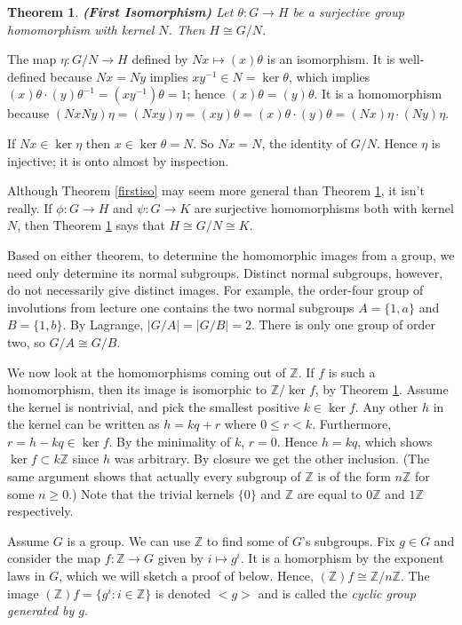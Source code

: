 \documentclass[letterpaper]{article}
\newtheorem{theorem}{Theorem}[section]
\newcommand{\mdot}{{\cdot}}
\newenvironment{proof}[1][Proof]{\begin{trivlist}
\item[\hskip \labelsep {\bfseries #1}]}{\end{trivlist}}
\begin{document}
\begin{theorem}
\label{iso1}
\emph{\textbf{(First Isomorphism)}}
Let $\theta \colon G \rightarrow H$ be a surjective group homomorphism with kernel $N$.  Then $H \cong G/N$.
\end{theorem}
\begin{proof}
The map $\eta \colon G/N \rightarrow H$ defined by $Nx \mapsto (x)\theta$ is an isomorphism. It is well-defined because $Nx = Ny$ implies $xy^{-1} \in N = \ker{\theta}$, which implies $(x)\theta\mdot(y)\theta^{-1} = (xy^{-1})\theta = 1$; hence $(x)\theta = (y)\theta$. It is a homomorphism because $(NxNy)\eta = (Nxy)\eta = (xy)\theta = (x)\theta\mdot(y)\theta = (Nx)\eta\mdot(Ny)\eta$.

If $Nx \in \ker{\eta}$ then $x \in \ker{\theta} = N$. So $Nx = N$, the identity of $G/N$. Hence $\eta$ is injective; it is onto almost by inspection.
\end{proof}

Although Theorem \ref{firstiso} may seem more general than Theorem \ref{iso1}, it isn't really. If $\phi \colon G \rightarrow H$ and $\psi \colon G \rightarrow K$ are surjective homomorphisms both with kernel $N$, then Theorem \ref{iso1} says that $H \cong G/N \cong K$.

Based on either theorem, to determine the homomorphic images from a group, we need only determine its normal subgroups. Distinct normal subgroups, however, do not necessarily give distinct images. For example, the order-four group of involutions from lecture one contains the two normal subgroups $A = \{1, a\}$ and $B = \{1, b\}$. By Lagrange, $|G/A| = |G/B| = 2$. There is only one group of order two, so $G/A \cong G/B$.

We now look at the homomorphisms coming out of $\mathbb{Z}$. If $f$ is such a homomorphism, then its image is isomorphic to $\mathbb{Z}/\ker{f}$, by Theorem \ref{iso1}. Assume the kernel is nontrivial, and pick the smallest positive $k \in \ker{f}$. Any other $h$ in the kernel can be written as $h = kq + r$ where $0 \le r < k$. Furthermore, $r = h - kq \in \ker{f}$. By the minimality of $k$, $r = 0$. Hence $h = kq$, which shows $\ker{f} \subset k\mathbb{Z}$ since $h$ was arbitrary. By closure we get the other inclusion. (The same argument shows that actually every subgroup of $\mathbb{Z}$ is of the form $n\mathbb{Z}$ for some $n \ge 0$.) Note that the trivial kernels $\{0\}$ and $\mathbb{Z}$ are equal to $0\mathbb{Z}$ and $1\mathbb{Z}$ respectively.

Assume $G$ is a group. We can use $\mathbb{Z}$ to find some of $G$'s subgroups. Fix $g \in G$ and consider the map $f \colon \mathbb{Z} \rightarrow G$ given by $i \mapsto g^{i}$. It is a homorphism by the exponent laws in $G$, which we will sketch a proof of below. Hence, $(\mathbb{Z})f \cong \mathbb{Z}/n\mathbb{Z}$. The image $(\mathbb{Z})f = \{g^i \colon i \in \mathbb{Z}\}$ is denoted ${<}g{>}$ and is called the \emph{cyclic group generated by $g$}.
\end{document}

